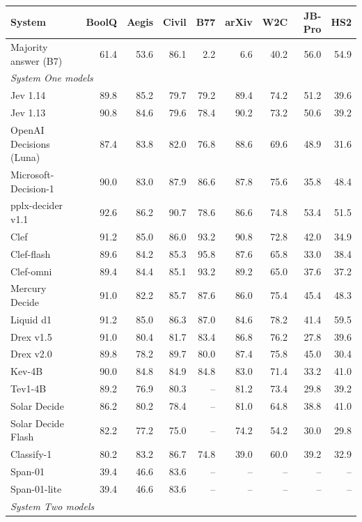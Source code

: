 \begin{table}[t]
\centering
\small
\begin{tabular}{lrrrrrrrr}
\toprule
System & BoolQ & Aegis & Civil & B77 & arXiv & W2C & JB-Pro & HS2 \\
\midrule
Majority answer (B7) & 61.4 & 53.6 & 86.1 & 2.2 & 6.6 & 40.2 & 56.0 & 54.9 \\
\midrule
\multicolumn{9}{l}{\textit{System One models}} \\
Jev 1.14 & 89.8 & 85.2 & 79.7 & 79.2 & 89.4 & 74.2 & 51.2 & 39.6 \\
Jev 1.13 & 90.8 & 84.6 & 79.6 & 78.4 & 90.2 & 73.2 & 50.6 & 39.2 \\
OpenAI Decisions (Luna) & 87.4 & 83.8 & 82.0 & 76.8 & 88.6 & 69.6 & 48.9 & 31.6 \\
Microsoft-Decision-1 & 90.0 & 83.0 & 87.9 & 86.6 & 87.8 & 75.6 & 35.8 & 48.4 \\
pplx-decider v1.1 & 92.6 & 86.2 & 90.7 & 78.6 & 86.6 & 74.8 & 53.4 & 51.5 \\
Clef & 91.2 & 85.0 & 86.0 & 93.2 & 90.8 & 72.8 & 42.0 & 34.9 \\
Clef-flash & 89.6 & 84.2 & 85.3 & 95.8 & 87.6 & 65.8 & 33.0 & 38.4 \\
Clef-omni & 89.4 & 84.4 & 85.1 & 93.2 & 89.2 & 65.0 & 37.6 & 37.2 \\
Mercury Decide & 91.0 & 82.2 & 85.7 & 87.6 & 86.0 & 75.4 & 45.4 & 48.3 \\
Liquid d1 & 91.2 & 85.0 & 86.3 & 87.0 & 84.6 & 78.2 & 41.4 & 59.5 \\
Drex v1.5 & 91.0 & 80.4 & 81.7 & 83.4 & 86.8 & 76.2 & 27.8 & 39.6 \\
Drex v2.0 & 89.8 & 78.2 & 89.7 & 80.0 & 87.4 & 75.8 & 45.0 & 30.4 \\
Kev-4B & 90.0 & 84.8 & 84.9 & 84.8 & 83.0 & 71.4 & 33.2 & 41.0 \\
Tev1-4B & 89.2 & 76.9 & 80.3 & -- & 81.2 & 73.4 & 29.8 & 39.2 \\
Solar Decide & 86.2 & 80.2 & 78.4 & -- & 81.0 & 64.8 & 38.8 & 41.0 \\
Solar Decide Flash & 82.2 & 77.2 & 75.0 & -- & 74.2 & 54.2 & 30.0 & 29.8 \\
Classify-1 & 80.2 & 83.2 & 86.7 & 74.8 & 39.0 & 60.0 & 39.2 & 32.9 \\
Span-01 & 39.4 & 46.6 & 83.6 & -- & -- & -- & -- & -- \\
Span-01-lite & 39.4 & 46.6 & 83.6 & -- & -- & -- & -- & -- \\
\midrule
\multicolumn{9}{l}{\textit{System Two models}} \\

\end{tabular}
\end{table}
